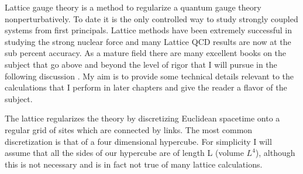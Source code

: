 
Lattice gauge theory is a method to regularize a quantum gauge theory nonperturbatively.
To date it is the only controlled way to study strongly coupled systems from first principals.
Lattice methods have been extremely successful in studying the strong nuclear force and many Lattice QCD results are now at the sub percent accuracy.
As a mature field there are many excellent books on the subject that go above and beyond the level of rigor that I will pursue in the following discussion \cite{degrand:book,smit:book,gattringer:book}.
My aim is to provide some technical details relevant to the calculations that I perform in later chapters and give the reader a flavor of the subject.

The lattice regularizes the theory by discretizing Euclidean spacetime onto a regular grid of sites which are connected by links.
The most common discretization is that of a four dimensional hypercube.
For simplicity I will assume that all the sides of our hypercube are of length L (volume $L^4$), although this is not necessary and is in fact not true of many lattice calculations.
